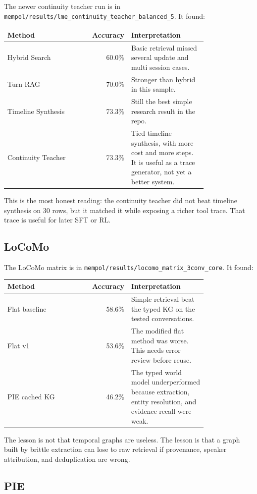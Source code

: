 \documentclass[11pt]{article}
\begin{document}
The newer continuity teacher run is in \texttt{mempol/results/lme\_continuity\_teacher\_balanced\_5}. It found:

\begin{longtable}{p{0.42\linewidth} r p{0.38\linewidth}}
\toprule
Method & Accuracy & Interpretation \\
\midrule
Hybrid Search & 60.0\% & Basic retrieval missed several update and multi session cases. \\
Turn RAG & 70.0\% & Stronger than hybrid in this sample. \\
Timeline Synthesis & 73.3\% & Still the best simple research result in the repo. \\
Continuity Teacher & 73.3\% & Tied timeline synthesis, with more cost and more steps. It is useful as a trace generator, not yet a better system. \\
\bottomrule
\end{longtable}

This is the most honest reading: the continuity teacher did not beat timeline synthesis on 30 rows, but it matched it while exposing a richer tool trace. That trace is useful for later SFT or RL.

\subsection{LoCoMo}

The LoCoMo matrix is in \texttt{mempol/results/locomo\_matrix\_3conv\_core}. It found:

\begin{longtable}{p{0.42\linewidth} r p{0.38\linewidth}}
\toprule
Method & Accuracy & Interpretation \\
\midrule
Flat baseline & 58.6\% & Simple retrieval beat the typed KG on the tested conversations. \\
Flat v1 & 53.6\% & The modified flat method was worse. This needs error review before reuse. \\
PIE cached KG & 46.2\% & The typed world model underperformed because extraction, entity resolution, and evidence recall were weak. \\
\bottomrule
\end{longtable}

The lesson is not that temporal graphs are useless. The lesson is that a graph built by brittle extraction can lose to raw retrieval if provenance, speaker attribution, and deduplication are wrong.

\subsection{PIE}
\end{document}
